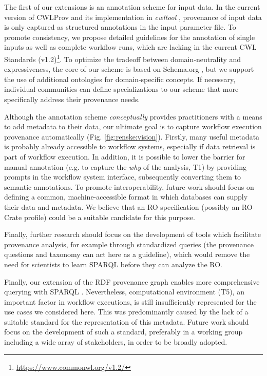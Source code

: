 The first of our extensions is an annotation scheme for input data. In the current version of CWLProv and its implementation in \emph{cwltool} \cite{crusoeCommonworkflowlanguageCwltool202305131557342023}, provenance of input data is only captured as structured annotations in the input parameter file. To promote consistency, we propose detailed guidelines for the annotation of single inputs as well as complete workflow runs, which are lacking in the current CWL Standards (v1.2)\footnote{\url{https://www.commonwl.org/v1.2/}}.  %
To optimize the tradeoff between domain-neutrality and expressiveness, the core of our scheme is based on Schema.org \cite{guhaBigDataMakes2015}, but we support the use of additional ontologies for domain-specific concepts. If necessary, individual communities can define specializations to our scheme that more specifically address their provenance needs.

Although the annotation scheme \emph{conceptually} provides practitioners with a means to add metadata to their data, our ultimate goal is to capture workflow execution provenance automatically (Fig. \ref{fig:renske:vision}). Firstly, many useful metadata is probably already accessible to workflow systems, especially if data retrieval is part of workflow execution. In addition, it is possible to lower the barrier for manual annotation (e.g. to capture the \emph{why} of the analysis, T1) by providing prompts in the workflow system interface, subsequently converting them to semantic annotations. To promote interoperability, future work should focus on defining a common, machine-accessible format in which databases can supply their data and metadata. We believe that an RO specification (possibly an RO-Crate profile) could be a suitable candidate for this purpose. 

Finally, further research should focus on the development of tools which facilitate provenance analysis, for example through standardized queries (the provenance questions and taxonomy can act here as a guideline), which would remove the need for scientists to learn SPARQL before they can analyze the RO. 

Finally, our extension of the RDF provenance graph enables more comprehensive querying with SPARQL \cite{sparql11-overview}. Nevertheless, computational environment (T5), an important factor in workflow executions, is still insufficiently represented for the use cases we considered here. This was predominantly caused by the lack of a suitable standard for the representation of this metadata. Future work should focus on the development of such a standard, preferably in a working group including a wide array of stakeholders, in order to be broadly adopted. 

